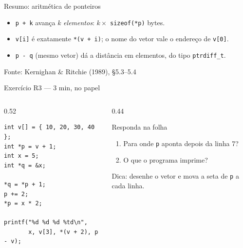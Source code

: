 \documentclass[aspectratio=169]{beamer}
\newcommand{\fonte}[1]{\vfill\hfill{\scriptsize\textcolor{UFSGray}{Fonte: #1}}}
\begin{document}
\begin{frame}{Resumo: aritmética de ponteiros}
  \begin{center}
  \end{center}
  \small
  \begin{itemize}
    \item \texttt{p + k} avança $k$ \emph{elementos}: $k \times$
      \texttt{sizeof(*p)} bytes.
    \item \texttt{v[i]} é exatamente \texttt{*(v + i)}; o nome do vetor vale
      o endereço de \texttt{v[0]}.
    \item \texttt{p - q} (mesmo vetor) dá a distância em elementos, do tipo
      \texttt{ptrdiff\_t}.
  \end{itemize}
  \fonte{Kernighan \& Ritchie (1989), §5.3--5.4~\cite{kernighan1989c}}
\end{frame}

\begin{frame}[fragile]{Exercício R3 --- 3 min, no papel}
  \begin{columns}[T]
    \begin{column}{0.52\textwidth}
\begin{lstlisting}[style=numC]
int v[] = { 10, 20, 30, 40 };
int *p = v + 1;
int x = 5;
int *q = &x;

*q = *p + 1;
p += 2;
*p = x * 2;

printf("%d %d %d %td\n",
       x, v[3], *(v + 2), p - v);
\end{lstlisting}
    \end{column}
    \begin{column}{0.44\textwidth}
      \begin{block}{Responda na folha}
        \begin{enumerate}
          \item[(a)] Para onde \texttt{p} aponta depois da linha 7?
          \item[(b)] O que o programa imprime?
        \end{enumerate}
      \end{block}
      \small Dica: desenhe o vetor e mova a seta de \texttt{p} a cada linha.
    \end{column}
  \end{columns}
\end{frame}
\end{document}
